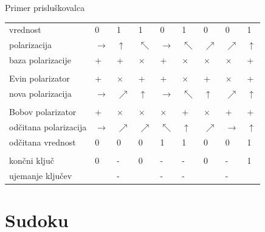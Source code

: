 \documentclass{beamer}
\newcommand{\cmark}{\ding{51}}
\newcommand{\xmark}{\ding{55}}
\begin{document}
\begin{frame}{Primer prisluškovalca}

\begin{tabular}{ l m{0.3 cm} m{0.3 cm} m{0.3 cm} m{0.3 cm} m{0.3 cm} m{0.3 cm} m{0.3 cm} m{0.3 cm}}
vrednost & 0 & 1 & 1 & 0 & 1 & 0 & 0 & 1\\
polarizacija & $\rightarrow$ & $\uparrow$ & $\nwarrow$ & $\rightarrow$ & $\nwarrow$ & $\nearrow$ & $\nearrow$  & $\uparrow$\\
baza polarizacije & + & + & $\times$ & + & $\times$ & $\times$ & $\times$ & + \\
\\
Evin polarizator & + & $\times$ & + & + & $\times$ & + & $\times$ & +\\
nova polarizacija & $\rightarrow$ & $\nearrow$ & $\uparrow$ & $\rightarrow$ & $\nwarrow$  & $\uparrow$ & $\nearrow$ & $\uparrow$\\
\\
Bobov polarizator & + & $\times$ & $\times$ & $\times$ & + & $\times$ & + & +\\
odčitana polarizacija & $\rightarrow$ & $\nearrow$ & $\nearrow$ & $\nwarrow$ & $\uparrow$  & $\nearrow$ & $\rightarrow$ & $\uparrow$\\
odčitana vrednost & 0 & 0 & 0 & 1 & 1 & 0 & 0 & 1\\
\\
končni ključ & 0 & - & 0 & - & - & 0 & - & 1\\
ujemanje ključev & \cmark & - & \xmark & - & - & \cmark & - & \cmark\\ 
\end{tabular}

\end{frame}


\section{Sudoku}

\end{document}
